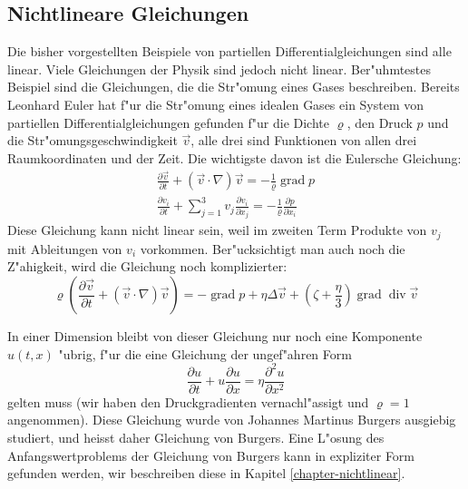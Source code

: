 \subsection{Nichtlineare Gleichungen\label{klassifikation:nichtlinear}}
Die bisher vorgestellten Beispiele von partiellen Differentialgleichungen
sind alle linear. Viele Gleichungen der Physik sind jedoch
nicht linear.  Ber"uhmtestes Beispiel sind die Gleichungen, die
die Str"omung eines Gases beschreiben. Bereits Leonhard Euler hat 
f"ur die Str"omung eines idealen Gases ein System von partiellen
Differentialgleichungen gefunden f"ur die Dichte $\varrho$, den Druck
$p$ und die Str"omungsgeschwindigkeit $\vec v$, alle drei sind Funktionen
von allen drei Raumkoordinaten und der Zeit. Die wichtigste davon
ist die Eulersche Gleichung:
\begin{align*}
\frac{\partial \vec v}{\partial t}
+(\vec v\cdot \nabla)\vec v
=-\frac1{\varrho}\operatorname{grad}p
\\
\frac{\partial v_i}{\partial t}
+\sum_{j=1}^3v_j\frac{\partial v_i}{\partial x_j}
=
-\frac1{\varrho}\frac{\partial p}{\partial x_i}
\end{align*}
Diese Gleichung kann nicht linear sein, weil im zweiten Term
Produkte von $v_j$ mit Ableitungen von $v_i$ vorkommen.
Ber"ucksichtigt man auch noch die Z"ahigkeit, wird die Gleichung
noch komplizierter:
\[
\varrho\left(
\frac{\partial\vec v}{\partial t}
+
(\vec v\cdot\nabla)\vec v
\right)
=
-\operatorname{grad}p+\eta\Delta \vec v+\left(\zeta+\frac{\eta}3\right)
\operatorname{grad}\operatorname{div}\vec v
\]

In einer Dimension bleibt von dieser Gleichung nur noch eine Komponente
$u(t,x)$ "ubrig, f"ur die eine Gleichung der ungef"ahren Form
\[
\frac{\partial u}{\partial t}+u\frac{\partial u}{\partial x}
=\eta\frac{\partial^2u}{\partial x^2}
\]
gelten muss (wir haben den Druckgradienten vernachl"assigt und
$\varrho = 1$ angenommen). Diese Gleichung wurde von
Johannes Martinus Burgers ausgiebig studiert, und heisst
daher Gleichung von Burgers.
Eine L"osung des Anfangswertproblems der Gleichung von Burgers kann 
in expliziter Form gefunden werden, wir beschreiben diese in Kapitel
\ref{chapter-nichtlinear}.


